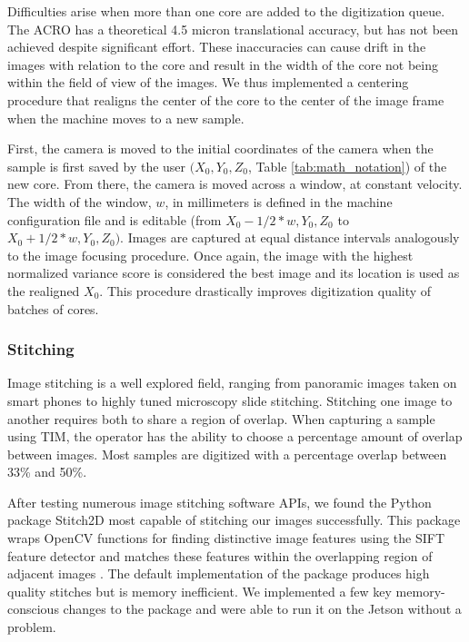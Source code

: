 \documentclass[a4paper,12pt]{article}
\begin{document}
Difficulties arise when more than one core are added to the digitization queue.
The ACRO has a theoretical 4.5 micron translational accuracy, but has not been achieved despite significant effort.
These inaccuracies can cause drift in the images with relation to the core and result in the width of the core not being within the field of view of the images.
We thus implemented a centering procedure that realigns the center of the core to the center of the image frame when the machine moves 
to a new sample. 

First, the camera is moved to the initial coordinates of the camera when the sample is first saved by the user $(X_0, Y_0, Z_0$, Table \ref{tab:math_notation}) of the new core. 
From there, the camera is moved across a window, at constant velocity. %
The width of the window, $w$, in millimeters is defined in the machine configuration file and is editable %
(from $X_0 - 1/2*{w}, Y_0, Z_0$ to $X_0 + 1/2*{w}, Y_0, Z_0)$. 
Images are captured at equal distance intervals analogously to the image focusing procedure. 
Once again, the image with the highest normalized variance score is considered the best image and its location is used as the realigned $X_0$.
This procedure drastically improves digitization quality of batches of cores.

\subsubsection{Stitching}

Image stitching is a well explored field, ranging from panoramic images taken on smart phones to highly tuned microscopy slide stitching. 
Stitching one image to another requires both to share a region of overlap. When capturing a sample using TIM, the operator has the ability to choose a percentage amount of overlap between images.
Most samples are digitized with a percentage overlap between 33\% and 50\%.

After testing numerous image stitching software APIs, we found the Python package Stitch2D most capable of stitching our images successfully. %
This package wraps OpenCV functions for finding distinctive image features using the SIFT feature detector and matches these features within the overlapping region of adjacent images \citep{lowe_distinctive_2004}. 
The default implementation of the package produces high quality stitches but is memory inefficient. %
We implemented a few key memory-conscious changes to the package and were able to run it on the Jetson without a problem. 
\end{document}
